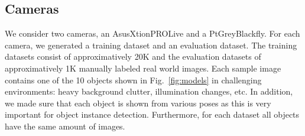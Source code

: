 \documentclass[10pt,twocolumn,letterpaper]{article}
\newcommand{\comment}[1]{}
\newcommand{\asus}[0]{AsusXtionPROLive\xspace}
\newcommand{\ptgrey}[0]{PtGreyBlackfly\xspace}
\begin{document}
\subsection{Cameras}
We consider two cameras, an \asus and a \ptgrey.  For each camera, we generated
a training dataset and an evaluation  dataset.  The training datasets consist of
approximatively 20K and  the evaluation datasets of  approximatively 1K manually
labeled real  world images.  Each  sample image contains  one of the  10 objects
shown  in Fig.~\ref{fig:models}  in challenging  environments: heavy  background
clutter, illumination changes, etc.  In addition,  we made sure that each object
is  shown from  various poses  as  this is  very important  for object  instance
detection.  Furthermore,  for each dataset all  objects have the same  amount of
images.    
\comment{We  use   Google's  object   detection  API~\cite{Huang17}   for  our
experiments.}
\end{document}
